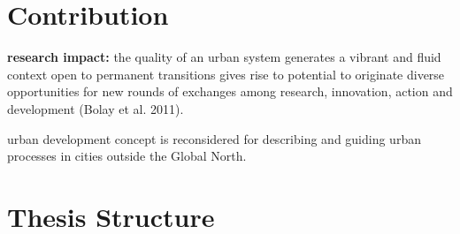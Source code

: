 \documentclass[11pt]{report}
\begin{document}
\section{Contribution}

\textbf{research impact:} the quality of an urban system generates a vibrant and fluid context open to permanent transitions gives rise to potential to originate diverse opportunities for new rounds of exchanges among research, innovation, action and development (Bolay et al. 2011).

urban development concept is reconsidered for describing and guiding urban processes in cities outside the Global North.

\section{Thesis Structure}
\end{document}
